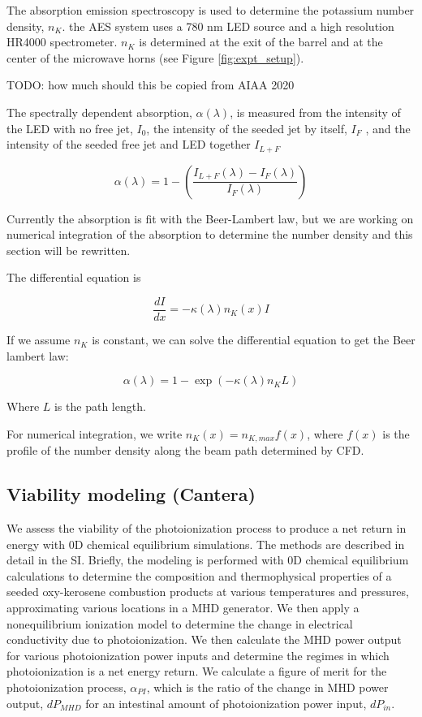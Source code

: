 The absorption emission spectroscopy is used to determine the potassium number density, $n_K$. the AES system uses a 780 nm LED source and a high resolution HR4000 spectrometer. $n_K$ is determined at the exit of the barrel and at the center of the microwave horns (see Figure \ref{fig:expt_setup}).

TODO: how much should this be copied from AIAA 2020

The spectrally dependent absorption, $\alpha(\lambda)$, is measured from the intensity of the LED with no free jet, $I_0$, the intensity
of the seeded jet by itself, $I_F$ , and the intensity of the seeded free jet and LED together $I_{L+F}$


\begin{equation}
    \alpha(\lambda) = 1 - \left(\frac{I_{L+F}(\lambda) - I_{F}(\lambda)}{I_F(\lambda)}\right)
\end{equation}

Currently the absorption is fit with the Beer-Lambert law, but we are working on numerical integration of the absorption to determine the number density and this section will be rewritten. 

The differential equation is 

\begin{equation}
    \frac{dI}{dx} = -\kappa(\lambda) n_K(x) I
\end{equation}

If we assume $n_K$ is constant, we can solve the differential equation to get the Beer lambert law:

\begin{equation}
    \alpha(\lambda) = 1 - \exp(-\kappa(\lambda) n_K L)
\end{equation}

Where $L$ is the path length.

For numerical integration, we write $n_K(x) = n_{K,max} f(x)$, where $f(x)$ is the profile of the number density along the beam path determined by CFD. 




\subsection{Viability modeling (Cantera)}

We assess the viability of the photoionization process to produce a net return in energy with 0D chemical equilibrium simulations. The methods are described in detail in the SI. Briefly, the modeling is performed with 0D chemical equilibrium calculations to determine the composition and thermophysical properties of a seeded oxy-kerosene combustion products at various temperatures and pressures, approximating various locations in a MHD generator. We then apply a nonequilibrium ionization model to determine the change in electrical conductivity due to photoionization. We then calculate the MHD power output for various photoionization power inputs and determine the regimes in which photoionization is a net energy return. We calculate a figure of merit for the photoionization process, $\alpha_{PI}$, which is the ratio of the change in MHD power output, $dP_{MHD}$ for an intestinal amount of photoionization power input, $dP_{in}$. 


